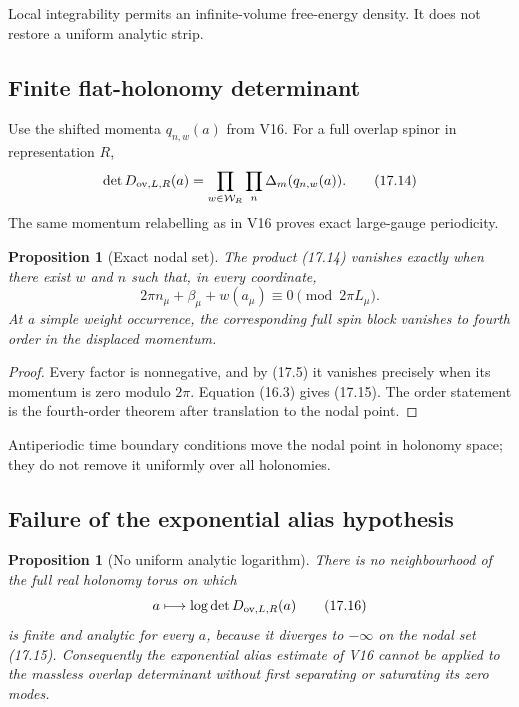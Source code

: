 \documentclass[11pt]{article}
\newtheorem{proposition}[theorem]{Proposition}
\begin{document}
Local integrability permits an infinite-volume free-energy density.  It
does not restore a uniform analytic strip.

\subsection{Finite flat-holonomy determinant}

Use the shifted momenta \(q_{n,w}(a)\) from V16.  For a full overlap
spinor in representation \(R\),
\[
 \det D_{{\rm ov},L,R}(a)
 =
 \prod_{w\in\mathcal W_R}\prod_n
 \Delta_m(q_{n,w}(a)).
 \tag{17.14}
\]
The same momentum relabelling as in V16 proves exact large-gauge
periodicity.

\begin{proposition}[Exact nodal set]
\label{prop:v11v17-nodal}
The product (17.14) vanishes exactly when there exist \(w\) and \(n\)
such that, in every coordinate,
\[
 2\pi n_\mu+\beta_\mu+w(a_\mu)
 \equiv0\pmod{2\pi L_\mu}.
 \tag{17.15}
\]
At a simple weight occurrence, the corresponding full spin block
vanishes to fourth order in the displaced momentum.
\end{proposition}

\begin{proof}
Every factor is nonnegative, and by (17.5) it vanishes precisely when its
momentum is zero modulo \(2\pi\).  Equation (16.3) gives (17.15).
The order statement is the fourth-order theorem after translation to the
nodal point.
\end{proof}

Antiperiodic time boundary conditions move the nodal point in holonomy
space; they do not remove it uniformly over all holonomies.

\subsection{Failure of the exponential alias hypothesis}

\begin{proposition}[No uniform analytic logarithm]
\label{prop:v11v17-no-strip}
There is no neighbourhood of the full real holonomy torus on which
\[
 a\longmapsto
 \log\det D_{{\rm ov},L,R}(a)
 \tag{17.16}
\]
is finite and analytic for every \(a\), because it diverges to
\(-\infty\) on the nodal set (17.15).  Consequently the exponential
alias estimate of V16 cannot be applied to the massless overlap
determinant without first separating or saturating its zero modes.
\end{proposition}
\end{document}
